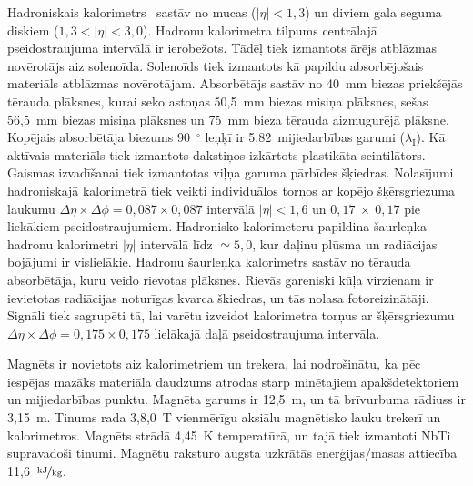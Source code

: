 Hadroniskais kalorimetrs~\cite{HCAL_report} sastāv no mucas ($\left|\eta\right|<1,3$) un diviem gala seguma diskiem ($1,3<\left|\eta\right|<3,0$). Hadronu kalorimetra tilpums centrālajā pseidostraujuma intervālā ir ierobežots. Tādēļ tiek izmantots ārējs \gls{atblāzmas novērotājs} aiz solenoīda. Solenoīds tiek izmantots kā papildu absorbējošais materiāls atblāzmas novērotājam. Absorbētājs sastāv no 40~mm biezas priekšējās tērauda plāksnes, kurai seko astoņas 50,5~mm biezas misiņa plāksnes, sešas 56,5~mm biezas misiņa plāksnes un 75~mm bieza tērauda aizmugurējā plāksne. Kopējais absorbētāja biezums 90~$^{\circ}$ leņķī ir 5,82~mijiedarbības garumi ($\lambda_{\text{I}}$). Kā aktīvais materiāls tiek izmantots \gls{dakstiņos} izkārtots plastikāta scintilātors. Gaismas izvadīšanai tiek izmantotas viļņa garuma pārbīdes šķiedras. Nolasījumi hadroniskajā kalorimetrā tiek veikti individuālos \gls{torņos} ar kopējo šķērsgriezuma laukumu $\Delta\eta\times\Delta\phi=0,087\times0,087$ intervālā $\left|\eta\right|<1,6$ un $0,17~\times~0,17$ pie liekākiem pseidostraujumiem. Hadronisko kalorimeteru papildina šaurleņka hadronu kalorimetri $\left|\eta\right|$ intervālā līdz $\simeq5,0$, kur daļiņu plūsma un radiācijas bojājumi ir vislielākie. Hadronu šaurleņķa kalorimetrs sastāv no tērauda absorbētāja, kuru veido rievotas plāksnes. Rievās gareniski kūļa virzienam ir ievietotas radiācijas noturīgas kvarca šķiedras, un tās nolasa fotoreizinātāji. Signāli tiek sagrupēti tā, lai varētu izveidot kalorimetra torņus ar šķērsgriezumu $\Delta\eta\times\Delta\phi=0,175\times0,175$ lielākajā daļā pseidostraujuma intervāla. 

Magnēts ir novietots aiz kalorimetriem un trekera, lai nodrošinātu, ka pēc iespējas mazāks materiāla daudzums atrodas starp minētajiem apakšdetektoriem un mijiedarbības punktu. Magnēta garums ir 12,5~m, un tā brīvurbuma rādiuss ir 3,15~m. Tinums rada 3,8,0~T vienmērīgu aksiālu magnētisko lauku trekerī un kalorimetros. Magnēts strādā 4,45~K temperatūrā, un tajā tiek izmantoti NbTi supravadoši tinumi. Magnētu raksturo augsta uzkrātās enerģijas/masas attiecība 11,6~$\nicefrac{\text{kJ}}{\text{kg}}$.

